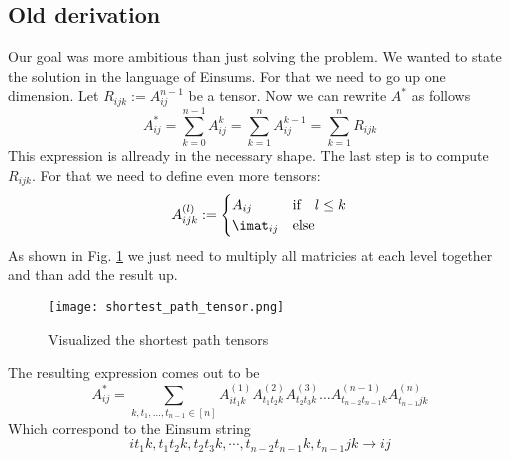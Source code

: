 \subsection{Old derivation}
Our goal was more ambitious than just solving the problem. We wanted to state the solution in the language of Einsums. For that we need to go up one dimension. Let $R_{ijk} := A^{n-1}_{ij}$ be a tensor. Now we can rewrite $A^*$ as follows
$$A^*_{ij} = \sum_{k=0}^{n-1} A^k_{ij} = \sum_{k=1}^{n}A^{k-1}_{ij} = \sum_{k=1}^{n}R_{ijk}$$
This expression is allready in the necessary shape. The last step is to compute $R_{ijk}$. For that we need to define even more tensors: 
$$A^{(l)}_{ijk} := 
\begin{cases}
    A_{ij} & \textrm{if}\quad l \leq k\\
    \imat_{ij} & \textrm{else}   
\end{cases}
$$
As shown in Fig. \ref*{fig:shortest_path_tensor} we just need to multiply all matricies at each level together and than add the result up.

\begin{figure}[h]
    \texttt{[image: shortest\_path\_tensor.png]}
    \caption{Visualized the shortest path tensors}
    \label{fig:shortest_path_tensor}
\end{figure}

The resulting expression comes out to be
$$A^*_{ij} = \sum_{k, t_1, \dots, t_{n-1} \in [n]} A^{(1)}_{it_1k}A^{(2)}_{t_1t_2k}A^{(3)}_{t_2t_3k}\dots A^{(n-1)}_{t_{n-2}t_{n-1}k}A^{(n)}_{t_{n-1}jk}$$
Which correspond to the Einsum string
$$it_1k, t_1t_2k, t_2t_3k, \cdots, t_{n-2}t_{n-1}k, t_{n-1}jk \to ij$$


